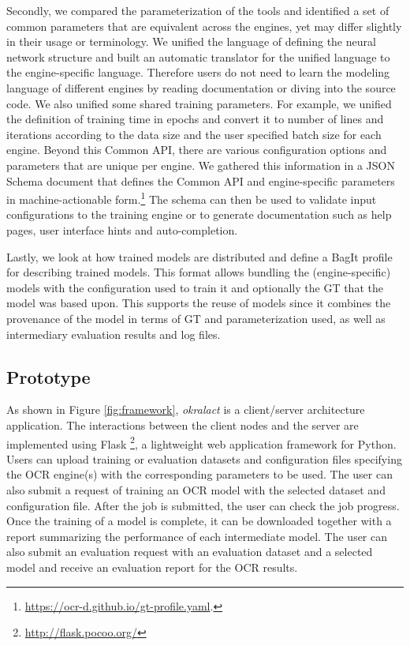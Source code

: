 \documentclass[sigconf]{acmart}
\begin{document}
Secondly, we compared the parameterization of the tools and
identified a set of common parameters that are equivalent across
the engines, yet may differ slightly in their usage or terminology. We unified the language of defining the neural network structure and built an automatic translator for the unified language to the engine-specific language. Therefore users do not need to learn the modeling language of different engines by reading documentation or diving into the source code. We also unified some shared training parameters.
For example, we unified the definition of training time in epochs and convert it to number of lines and iterations according to the data size and the user specified batch size for each engine.
Beyond this Common API, there are various configuration options and
parameters that are unique per engine. We gathered this information
in a JSON Schema document that defines the Common API and
engine-specific parameters in machine-actionable
form.\footnote{\url{https://ocr-d.github.io/gt-profile.yaml}.} The
schema can then be used to validate input configurations to the
training engine or to generate documentation such as help pages,
user interface hints and auto-completion.

Lastly, we look at how trained models are distributed and
define a BagIt \cite{kunze2018bagit} profile for describing trained models. 
This format allows bundling the (engine-specific) models with the 
configuration used to train it and optionally the
GT that the model was based upon. This supports the reuse of models 
since it combines the provenance of the model in terms of GT and 
parameterization used, as well as  intermediary evaluation results and 
log files.



\subsection{Prototype}
\label{sec:prototype}

As shown in Figure \ref{fig:framework}, \textit{okralact} is a client/server
architecture application. The interactions between the client nodes and the
server are implemented using Flask \footnote{\url{http://flask.pocoo.org/}}, a lightweight web application framework for Python.
Users can upload training or evaluation datasets and configuration files
specifying the OCR engine(s) with the corresponding parameters to be used. 
The user can also submit a request of training an OCR model with the selected 
dataset and configuration file. After the job is submitted, the user can check the job
progress. Once the training of a model is complete, it can be downloaded together with a report summarizing the performance of each intermediate model.
The user can also submit an evaluation request with an evaluation dataset and
a selected model and receive an evaluation report for the OCR results.
\end{document}
